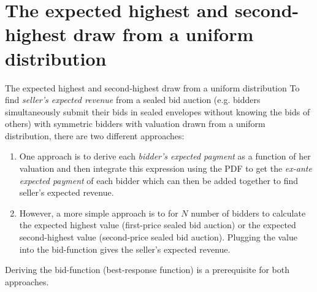 \section{The expected highest and second-highest draw from a uniform distribution}

\begin{frame}{The expected highest and second-highest draw from a uniform distribution}
    To find \textit{seller's expected revenue} from a sealed bid auction (e.g. bidders simultaneously submit their bids in sealed envelopes without knowing the bids of others) with symmetric bidders with valuation drawn from a uniform distribution, there are two different approaches:
    \begin{enumerate}
      \item One approach is to derive each \textit{bidder's expected payment} as a function of her valuation and then integrate this expression using the PDF to get the \textit{ex-ante expected payment} of each bidder which can then be added together to find seller's expected revenue.
      \item However, a more simple approach is to for $N$ number of bidders to calculate the expected highest value (first-price sealed bid auction) or the expected second-highest value (second-price sealed bid auction). Plugging the value into the bid-function gives the seller's expected revenue.
    \end{enumerate}
    Deriving the bid-function (best-response function) is a prerequisite for both approaches.
\end{frame}

